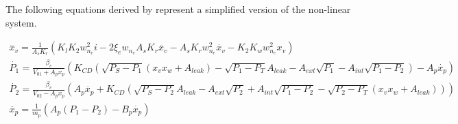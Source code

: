 The following equations derived by  represent a simplified version of the non-linear system.

\begin{gather}
\dddot{x_v} = \frac{1}{A_s K_r} (K_l K_2 w_{n_e}^2 i - 2 \xi_e w_{n_e} A_s K_r \ddot{x_v} - A_s K_r w_{n_e}^2 \dot{x_v} - K_2 K_w w_{n_e}^2 x_v) \label{eq:nonlinear_ehsv2} \\
\dot{P_1} = \frac{\beta_c}{V_{01} + A_p x_p} (K_{CD} (\sqrt{P_S - P_1}(x_v x_w + A_{leak}) - \sqrt{P_1-P_T} A_{leak} - A_{ext} \sqrt{P_1} - A_{int} \sqrt{P_1-P_2}) - A_p\dot{x_p}) \label{eq:P1nonlinear2} \\
\dot{P_2} = \frac{\beta_c}{V_{02} - A_p x_p} (A_p\dot{x_p} + K_{CD}(\sqrt{P_S-P_2} A_{leak} - A_{ext} \sqrt{P_2} + A_{int} \sqrt{P_1-P_2} - \sqrt{P_2 - P_T}(x_v x_w + A_{leak}))) \label{eq:P2nonlinear2} \\
\ddot{x_p} = \frac{1}{m_p} (A_p (P_1 - P_2) - B_p \dot{x_p}) \label{eq:piston_nonlinear2}
\end{gather}
%
%


